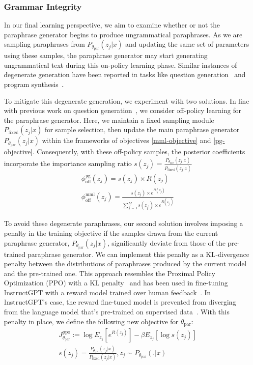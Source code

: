 \documentclass[11pt]{article}
\begin{document}
\subsubsection{Grammar Integrity}
In our final learning perspective, we aim to examine whether or not the paraphrase generator begins to produce ungrammatical paraphrases. As we are sampling paraphrases from $P_{\theta_{\text{par}}}(z_{j}|x)$ and updating the same set of parameters using these samples, the paraphrase generator may start generating ungrammatical text during this on-policy learning phase. Similar instances of degenerate generation have been reported in tasks like question generation~\cite{najafi-fyshe-2023-weakly} and program synthesis~\cite{NEURIPS2018_f4e369c0}.

To mitigate this degenerate generation, we experiment with two solutions. In line with previous work on question generation~\cite{najafi-fyshe-2023-weakly}, we consider off-policy learning for the paraphrase generator. Here, we maintain a fixed sampling module $P_{\text{fixed}}(z_{j}|x)$ for sample selection, then update the main paraphrase generator $P_{\theta_{\text{par}}}(z_{j}|x)$ within the frameworks of objectives \ref{mml-objective} and \ref{pg-objective}. Consequently, with these off-policy samples, the posterior coefficients incorporate the importance sampling ratio $s(z_{j}) = \frac{P_{\theta_{\text{par}}}(z_{j}|x)}{P_{\text{fixed}}(z_{j}|x)}$
\begin{multline}
\phi^{\text{pg}}_{\text{off}}(z_{j}) = s(z_{j}) \times R(z_{j})\\
\phi^{\text{mml}}_{\text{off}}(z_{j}) = \frac{s(z_{j}) \times e^{R(z_{j})}}{\sum^{M}_{j^{'}=1} s(z_{j^{'}}) \times e^{R(z_{j^{'}})}}
\label{off-pg-mml-objective}
\end{multline}

To avoid these degenerate paraphrases, our second solution involves imposing a penalty in the training objective if the samples drawn from the current paraphrase generator, $P_{\theta_{\text{par}}}(z_{j}|x)$, significantly deviate from those of the pre-trained paraphrase generator. We can implement this penalty as a KL-divergence penalty between the distributions of paraphrases produced by the current model and the pre-trained one. This approach resembles the Proximal Policy Optimization (PPO) with a KL penalty~\cite{DBLP:journals/corr/SchulmanWDRK17} and has been used in fine-tuning InstructGPT with a reward model trained over human feedback~\cite{ouyang2022training}. In InstructGPT's case, the reward fine-tuned model is prevented from diverging from the language model that's pre-trained on supervised data~\cite{ouyang2022training}. With this penalty in place, we define the following new objective for $\theta_{\text{par}}$:
\begin{multline}
J^{\text{ppo}}_{\theta_{\text{par}}} 
:= \log E_{z_{j}} [e^{R(z_{j})}] - \beta E_{z_{j}} [\log s(z_j)] \\
s(z_{j}) = \frac{P_{\theta_{\text{par}}}(z_{j}|x)}{P_{\text{fixed}}
(z_{j}|x)}, z_{j} \sim P_{\theta_{\text{par}}}(.|x)
\label{lmfp-expect-ppo-objective}
\end{multline}
\end{document}
